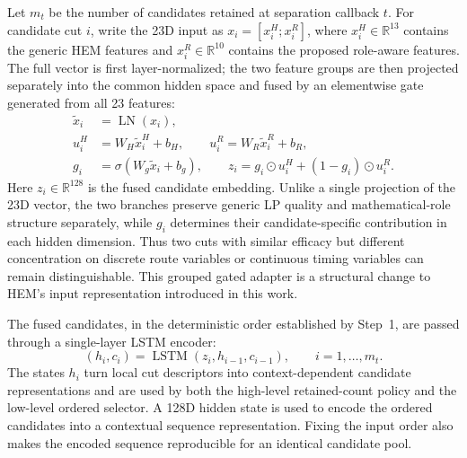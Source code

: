 \documentclass[final,5p,times,twocolumn]{elsarticle}
\begin{document}
Let $m_t$ be the number of candidates retained at separation callback $t$. For candidate cut $i$, write the 23D input as $x_i=[x_i^{H};x_i^{R}]$, where $x_i^{H}\in\mathbb R^{13}$ contains the generic HEM features and $x_i^{R}\in\mathbb R^{10}$ contains the proposed role-aware features. The full vector is first layer-normalized; the two feature groups are then projected separately into the common hidden space and fused by an elementwise gate generated from all 23 features:
\begin{equation}
\begin{aligned}
\widetilde x_i&=\operatorname{LN}(x_i),\\
u_i^{H}&=W_H\widetilde x_i^{H}+b_H,\qquad
u_i^{R}=W_R\widetilde x_i^{R}+b_R,\\
g_i&=\sigma(W_g\widetilde x_i+b_g),\qquad
z_i=g_i\odot u_i^{H}+(1-g_i)\odot u_i^{R}.
\end{aligned}
\label{eq:gated-encoding-en}
\end{equation}
Here $z_i\in\mathbb R^{128}$ is the fused candidate embedding. Unlike a single projection of the 23D vector, the two branches preserve generic LP quality and mathematical-role structure separately, while $g_i$ determines their candidate-specific contribution in each hidden dimension. Thus two cuts with similar efficacy but different concentration on discrete route variables or continuous timing variables can remain distinguishable. This grouped gated adapter is a structural change to HEM's input representation introduced in this work.

The fused candidates, in the deterministic order established by Step~1, are passed through a single-layer LSTM encoder:
\begin{equation}
(h_i,c_i)=\operatorname{LSTM}(z_i,h_{i-1},c_{i-1}),\qquad i=1,\ldots,m_t .
\label{eq:lstm-encoding-en}
\end{equation}
The states $h_i$ turn local cut descriptors into context-dependent candidate representations and are used by both the high-level retained-count policy and the low-level ordered selector. A 128D hidden state is used to encode the ordered candidates into a contextual sequence representation. Fixing the input order also makes the encoded sequence reproducible for an identical candidate pool.
\end{document}
